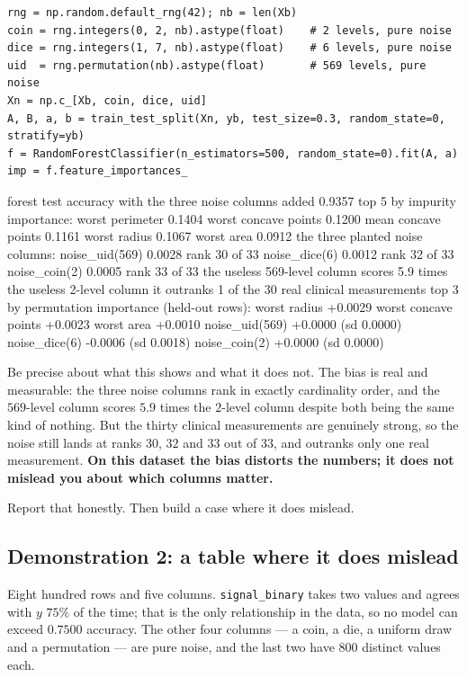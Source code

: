 \documentclass[11pt]{article}
\begin{document}
\begin{lstlisting}
rng = np.random.default_rng(42); nb = len(Xb)
coin = rng.integers(0, 2, nb).astype(float)    # 2 levels, pure noise
dice = rng.integers(1, 7, nb).astype(float)    # 6 levels, pure noise
uid  = rng.permutation(nb).astype(float)       # 569 levels, pure noise
Xn = np.c_[Xb, coin, dice, uid]
A, B, a, b = train_test_split(Xn, yb, test_size=0.3, random_state=0, stratify=yb)
f = RandomForestClassifier(n_estimators=500, random_state=0).fit(A, a)
imp = f.feature_importances_
\end{lstlisting}
\begin{codeout}
forest test accuracy with the three noise columns added 0.9357
top 5 by impurity importance:
   worst perimeter            0.1404
   worst concave points       0.1200
   mean concave points        0.1161
   worst radius               0.1067
   worst area                 0.0912
the three planted noise columns:
   noise_uid(569)             0.0028   rank 30 of 33
   noise_dice(6)              0.0012   rank 32 of 33
   noise_coin(2)              0.0005   rank 33 of 33
the useless 569-level column scores 5.9 times the useless 2-level column
it outranks 1 of the 30 real clinical measurements
top 3 by permutation importance (held-out rows):
   worst radius               +0.0029
   worst concave points       +0.0023
   worst area                 +0.0010
   noise_uid(569)             +0.0000  (sd 0.0000)
   noise_dice(6)              -0.0006  (sd 0.0018)
   noise_coin(2)              +0.0000  (sd 0.0000)
\end{codeout}

Be precise about what this shows and what it does not. The bias is real and
measurable: the three noise columns rank in exactly cardinality order, and the
$569$-level column scores $5.9$ times the $2$-level column despite both being
the same kind of nothing. But the thirty clinical measurements are genuinely
strong, so the noise still lands at ranks $30$, $32$ and $33$ out of $33$, and
outranks only one real measurement. \textbf{On this dataset the bias distorts
the numbers; it does not mislead you about which columns matter.}

Report that honestly. Then build a case where it does mislead.

\subsection{Demonstration 2: a table where it does mislead}

Eight hundred rows and five columns. \texttt{signal\_binary} takes two values
and agrees with $y$ $75\%$ of the time; that is the only relationship in the
data, so no model can exceed $0.7500$ accuracy. The other four columns --- a
coin, a die, a uniform draw and a permutation --- are pure noise, and the last
two have $800$ distinct values each.
\end{document}
